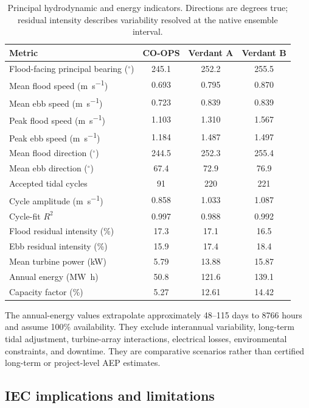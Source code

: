 \documentclass[12pt,sort&compress]{elsarticle}
\begin{document}
\begin{table}[tbp]
\centering
\caption{Principal hydrodynamic and energy indicators. Directions are degrees true; residual intensity describes variability resolved at the native ensemble interval.}
\label{tab:comparative-results}
\begin{tabular}{@{}lccc@{}}
\toprule
Metric & CO-OPS & Verdant A & Verdant B \\
\midrule
Flood-facing principal bearing ($^\circ$) & 245.1 & 252.2 & 255.5 \\
Mean flood speed (\si{\metre\per\second}) & 0.693 & 0.795 & 0.870 \\
Mean ebb speed (\si{\metre\per\second}) & 0.723 & 0.839 & 0.839 \\
Peak flood speed (\si{\metre\per\second}) & 1.103 & 1.310 & 1.567 \\
Peak ebb speed (\si{\metre\per\second}) & 1.184 & 1.487 & 1.497 \\
Mean flood direction ($^\circ$) & 244.5 & 252.3 & 255.4 \\
Mean ebb direction ($^\circ$) & 67.4 & 72.9 & 76.9 \\
Accepted tidal cycles & 91 & 220 & 221 \\
Cycle amplitude (\si{\metre\per\second}) & 0.858 & 1.033 & 1.087 \\
Cycle-fit $R^2$ & 0.997 & 0.988 & 0.992 \\
Flood residual intensity (\%) & 17.3 & 17.1 & 16.5 \\
Ebb residual intensity (\%) & 15.9 & 17.4 & 18.4 \\
Mean turbine power (\si{\kilo\watt}) & 5.79 & 13.88 & 15.87 \\
Annual energy (\si{\mega\watt\hour}) & 50.8 & 121.6 & 139.1 \\
Capacity factor (\%) & 5.27 & 12.61 & 14.42 \\
\bottomrule
\end{tabular}
\end{table}

The annual-energy values extrapolate approximately 48--115 days to 8766 hours and assume 100\% availability. They exclude interannual variability, long-term tidal adjustment, turbine-array interactions, electrical losses, environmental constraints, and downtime. They are comparative scenarios rather than certified long-term or project-level AEP estimates.

\subsection{IEC implications and limitations}
\label{subsec:iec-results}
\end{document}
